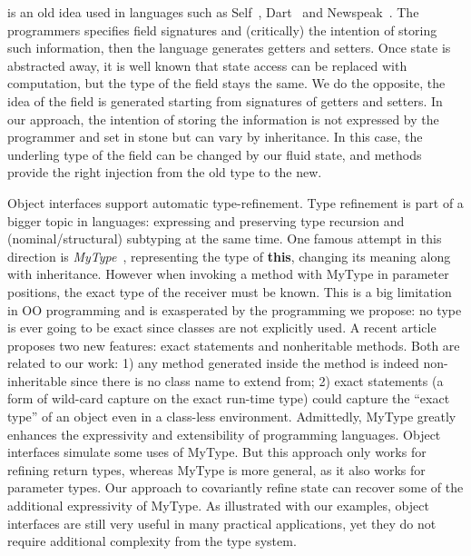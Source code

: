% 


is an old idea used in languages such as
Self~\cite{Ungar1987self}, Dart~\cite{Dart} and Newspeak~\cite{Bracha_thenewspeak}.
The programmers specifies field signatures and (critically) the intention of storing such information,
then the language generates getters and setters.
Once state is abstracted away, it is well known that state
access can be replaced with computation, but the type of the field stays the same.
We do the opposite, the idea of the field is generated starting from signatures of
getters and setters. %
In our approach, the intention of storing the information is not expressed by the programmer and set in stone
but can vary by inheritance.
In this case, the underling type of the field can be changed by our fluid state,
 and \Q@with@ methods provide the right injection from the old type to the new.

Object interfaces support automatic type-refinement.
Type refinement is part of a bigger topic in \classbased languages: expressing and
preserving type recursion and (nominal/structural) subtyping at the same time.
One famous attempt in this direction is
\emph{MyType}~\cite{bruce1994paradigmatic}, representing the type of
\textbf{this}, changing its meaning along with inheritance. However when
invoking a method with MyType in parameter positions, the exact type of the
receiver must be known. This is a big limitation in \classbased OO
programming and is exasperated by the \interfacebased programming we propose: no
type is ever going to be exact since classes are not explicitly used. A recent
article~\cite{Saito2013933} proposes two
new features: exact statements and nonheritable methods. Both are
related to our work: 1) any method generated inside the \Q@of@ method is indeed
non-inheritable since there is no class name to extend from; 2) exact
statements (a form of wild-card capture on the exact run-time type) could
capture the ``exact type'' of an object even in a class-less
environment.
Admittedly, MyType greatly enhances the expressivity and extensibility of
\objectoriented programming languages. Object interfaces %
simulate some uses of MyType. But this approach only works for refining
return types, whereas MyType is more general, as it also works for
parameter types. Our approach to covariantly refine state can recover
some of the additional expressivity of MyType. As illustrated with our examples, object interfaces are still very useful in many
practical applications, yet they do not require additional
complexity from the type system.

